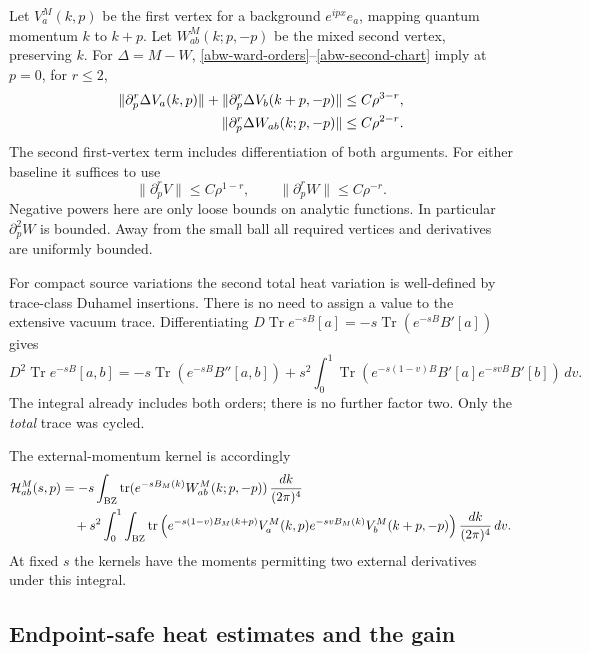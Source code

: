 \documentclass[11pt]{article}
\theoremstyle{remark}
\begin{document}
Let \(V_a^M(k,p)\) be the first vertex for a background
\(e^{ipx}e_a\), mapping quantum momentum \(k\) to \(k+p\).
Let \(W_{ab}^M(k;p,-p)\) be the mixed second vertex, preserving \(k\).
For \(\Delta=M-W\), \eqref{abw-ward-orders}--\eqref{abw-second-chart}
imply at \(p=0\), for \(r\le2\),
\begin{align}
 \|\partial_p^r\Delta V_a(k,p)\|
 +\|\partial_p^r\Delta V_b(k+p,-p)\|
       &\le C\rho^{3-r},\notag\\
 \|\partial_p^r\Delta W_{ab}(k;p,-p)\|
       &\le C\rho^{2-r}.
 \label{abw-vertex-difference}
\end{align}
The second first-vertex term includes differentiation of both arguments.
For either baseline it suffices to use
\begin{equation}
 \|\partial_p^rV\|\le C\rho^{1-r},\qquad
 \|\partial_p^rW\|\le C\rho^{-r}.
 \label{abw-baseline-vertices}
\end{equation}
Negative powers here are only loose bounds on analytic functions.
In particular \(\partial_p^2W\) is bounded. Away from the small ball all
required vertices and derivatives are uniformly bounded.

For compact source variations the second total heat variation is
well-defined by trace-class Duhamel insertions. There is no need to assign
a value to the extensive vacuum trace. Differentiating
\(D\operatorname{Tr}e^{-sB}[a]=-s\operatorname{Tr}(e^{-sB}B'[a])\)
gives
\begin{equation}
 D^2\operatorname{Tr}e^{-sB}[a,b]
 =-s\operatorname{Tr}(e^{-sB}B''[a,b])
 +s^2\int_0^1\operatorname{Tr}
  (e^{-s(1-v)B}B'[a]e^{-svB}B'[b])\,dv.
 \label{abw-total-duhamel}
\end{equation}
The integral already includes both orders; there is no further factor
two. Only the \emph{total} trace was cycled.

The external-momentum kernel is accordingly
\begin{align}
 {\cal H}_{ab}^M(s,p)
 &=-s\int_{\mathrm{BZ}}\operatorname{tr}
       (e^{-sB_M(k)}W_{ab}^M(k;p,-p))\,\frac{dk}{(2\pi)^4}
       \notag\\
 &\quad+s^2\int_0^1\int_{\mathrm{BZ}}\operatorname{tr}
 \left(e^{-s(1-v)B_M(k+p)}V_a^M(k,p)
       e^{-svB_M(k)}V_b^M(k+p,-p)\right)
                          \frac{dk}{(2\pi)^4}\,dv.
 \label{abw-diagram}
\end{align}
At fixed \(s\) the kernels have the moments permitting two external
derivatives under this integral.

\subsection{Endpoint-safe heat estimates and the gain}
\label{abw-estimate-section}
\end{document}
